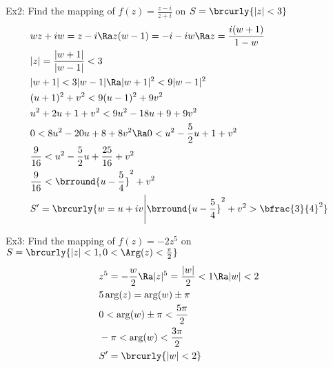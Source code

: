 Ex2: Find the mapping of $f(z)=\frac{z-i}{z+i}$ on $S=\brcurly{|z|<3}$
\begin{align*}
    &wz+iw=z-i\Ra z(w-1)=-i-iw\Ra z=\frac{i(w+1)}{1-w}\\
    &|z|=\frac{|w+1|}{|w-1|}<3\\
    &|w+1|<3|w-1|\Ra |w+1|^2<9|w-1|^2\\
    &(u+1)^2+v^2<9(u-1)^2+9v^2\\
    &u^2+2u+1+v^2<9u^2-18u+9+9v^2\\
    &0<8u^2-20u+8+8v^2\Ra 0<u^2-\frac{5}{2}u+1+v^2\\
    &\frac{9}{16}<u^2-\frac{5}{2}u+\frac{25}{16}+v^2\\
    &\frac{9}{16}<\brround{u-\frac{5}{4}}^2+v^2\\
    &S'=\brcurly{w=u+iv\Bigg\vert\brround{u-\frac{5}{4}}^2+v^2>\bfrac{3}{4}^2}
\end{align*}


Ex3: Find the mapping of $f(z)=-2z^5$ on $S=\brcurly{|z|<1,0<\Arg(z)<\frac{\pi}{2}}$
\begin{align*}
    &z^5=-\frac{w}{2}\Ra |z|^5=\frac{|w|}{2}<1\Ra |w|<2\\
    &5\arg(z)=\arg(w)\pm\pi \\
    &0<\arg(w)\pm\pi <\frac{5\pi}{2}\\
    &-\pi<\arg(w)<\frac{3\pi}{2}\\
    &S'=\brcurly{|w|<2}
\end{align*}